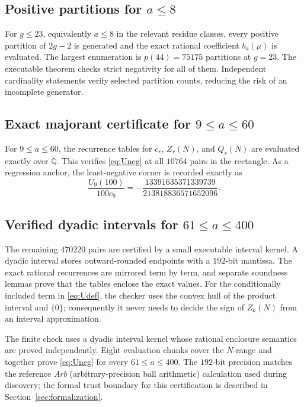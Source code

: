 \documentclass[11pt]{article}
\theoremstyle{definition}
\theoremstyle{remark}
\newcommand{\Q}{\mathbb Q}
\begin{document}
\subsection{Positive partitions for \texorpdfstring{$a\le8$}{a<=8}}

For $g\le23$, equivalently $a\le8$ in the relevant residue classes, every
positive partition of $2g-2$ is generated and the exact rational coefficient
$b_a(\mu)$ is evaluated.  The largest enumeration is $p(44)=75175$
partitions at $g=23$.  The executable theorem checks strict negativity for
all of them.  Independent cardinality statements verify selected partition
counts, reducing the risk of an incomplete generator.

\subsection{Exact majorant certificate for \texorpdfstring{$9\le a\le60$}{9<=a<=60}}

For $9\le a\le60$, the recurrence tables for $c_r$, $Z_r(N)$, and $Q_r(N)$
are evaluated exactly over $\Q$.  This verifies \eqref{eq:Uneg} at all
$10764$ pairs in the rectangle.  As a regression anchor, the least-negative
corner is recorded exactly as
\begin{equation}\label{eq:corner}
 \frac{U_9(100)}{100c_9}
 =-\frac{13391635371339739}{213818836571652096}.
\end{equation}

\subsection{Verified dyadic intervals for \texorpdfstring{$61\le a\le400$}{61<=a<=400}}

The remaining $470220$ pairs are certified by a small executable interval
kernel.  A dyadic interval stores outward-rounded endpoints with a $192$-bit
mantissa.  The exact rational recurrences are mirrored term by term, and
separate soundness lemmas prove that the tables enclose the exact values.
For the conditionally included term in \eqref{eq:Udef}, the checker uses the
convex hull of the product interval and $\{0\}$; consequently it never needs
to decide the sign of $Z_k(N)$ from an interval approximation.

The finite check uses a dyadic interval kernel whose rational enclosure
semantics are proved independently.  Eight evaluation chunks cover the
$N$-range and together prove \eqref{eq:Uneg} for every $61\le a\le400$.
The $192$-bit precision matches the reference \emph{Arb}
(arbitrary-precision ball arithmetic) calculation used during discovery; the
formal trust boundary for this certification is described in
Section~\ref{sec:formalization}.
\end{document}
